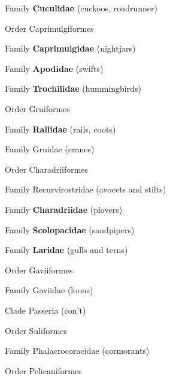 \documentclass[10pt]{article}
\newlength\mylength
\newcommand*{\growparindent}{\addtolength{\parindent}{\mylength}}
\newcommand*{\reduceparindent}{\addtolength{\parindent}{-1\mylength}}
\begin{document}
\begin{multicols}{2}
\begin{spacing}{1.35}
    	  Family \textbf{Cuculidae} (cuckoos, roadrunner)
    	  
    	\reduceparindent
    	
    	Order Caprimulgiformes
    	
    		\growparindent
    		
    		Family \textbf{Caprimulgidae} (nightjars)
    		
    		Family \textbf{Apodidae} (swifts)
    		
    		Family \textbf{Trochilidae} (hummingbirds)
    		
    	\reduceparindent
    	
    	Order Gruiformes
    	
    	\growparindent
    	
    		Family \textbf{Rallidae} (rails, coots)
    		
    		Family Gruidae (cranes)
    		
    	\reduceparindent
    	
    	Order Charadriiformes
    	
    		\growparindent
    		
    		Family Recurvirostridae (avocets and stilts)
    		
    		Family \textbf{Charadriidae} (plovers)
    		
    		Family \textbf{Scolopacidae} (sandpipers)
    		
    		Family \textbf{Laridae} (gulls and terns)
    		
    	\reduceparindent
    	
    	Order Gaviiformes
    	
    		\growparindent
    		
    		Family Gaviidae (loons)
\columnbreak

	\reduceparindent
	
	\reduceparindent
      
      
    Clade Passeria (con't)
      
      \growparindent
      
      Order Suliformes
      
      	\growparindent
      
      	Family Phalacrocoracidae (cormorants)
      	
      \reduceparindent
      
      Order Pelicaniformes
      
      	\growparindent
      	

\end{spacing}
\end{multicols}
\end{document}
